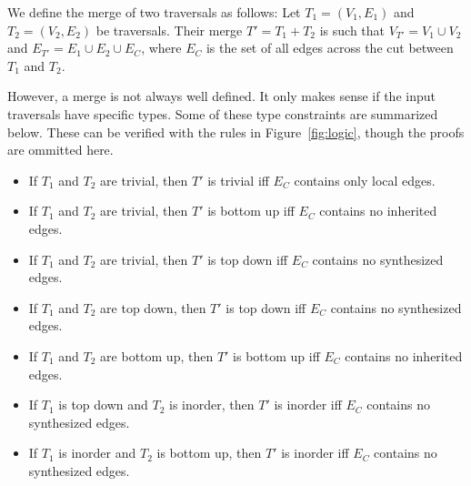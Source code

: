 \documentclass[10pt]{article}
\begin{document}
    We define the merge of two traversals as follows: Let $T_1 = (V_1, E_1)$ and $T_2 = (V_2, E_2)$ be traversals. Their merge $T' = T_1 + T_2$ is such that $V_{T'} = V_1 \cup V_2$ and $E_{T'} = E_1 \cup E_2 \cup E_C$, where $E_C$ is the set of all edges across the cut between $T_1$ and $T_2$.

    However, a merge is not always well defined. It only makes sense if the input traversals have specific types. Some of these type constraints are summarized below. These can be verified with the rules in Figure~\ref{fig:logic}, though the proofs are ommitted here.
    \begin{itemize}
        \item If $T_1$ and $T_2$ are trivial, then $T'$ is trivial iff $E_C$ contains only local edges.
        \item If $T_1$ and $T_2$ are trivial, then $T'$ is bottom up iff $E_C$ contains no inherited edges.
        \item If $T_1$ and $T_2$ are trivial, then $T'$ is top down iff $E_C$ contains no synthesized edges.
        \item If $T_1$ and $T_2$ are top down, then $T'$ is top down iff $E_C$ contains no synthesized edges.
        \item If $T_1$ and $T_2$ are bottom up, then $T'$ is bottom up iff $E_C$ contains no inherited edges.
        \item If $T_1$ is top down and $T_2$ is inorder, then $T'$ is inorder iff $E_C$ contains no synthesized edges.
        \item If $T_1$ is inorder and $T_2$ is bottom up, then $T'$ is inorder iff $E_C$ contains no synthesized edges.

    \end{itemize}
\end{document}

